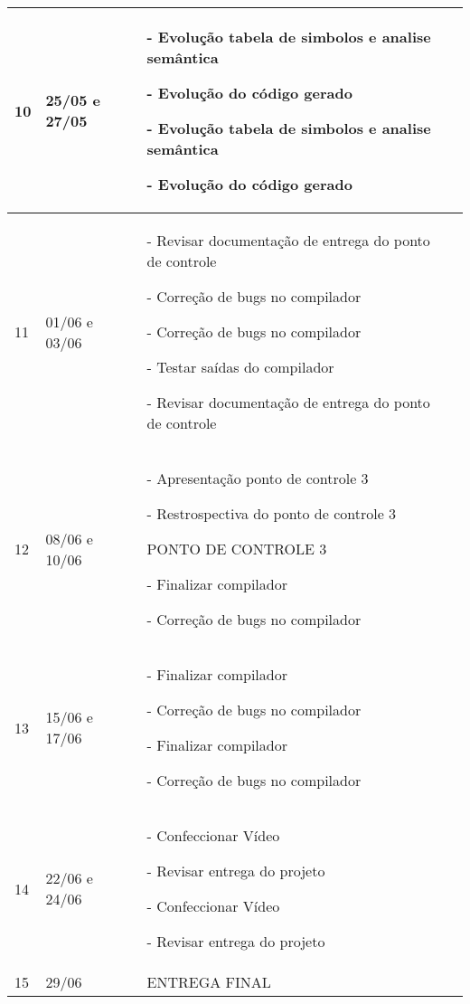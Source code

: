 \begin{table}[htb]
\center
\footnotesize
\begin{tabular}{|p{1.4cm}|p{3cm}|p{8cm}|p{8cm}|}
  \hline
   10 & 25/05 e 27/05 &
   \par - Evolução tabela de simbolos e analise semântica 
   \par - Evolução do código gerado 
   \par - Evolução tabela de simbolos e analise semântica 
   \par - Evolução do código gerado \\
   \hline
   11 & 01/06 e 03/06 &
   \par - Revisar documentação de entrega do ponto de controle 
   \par - Correção de bugs no compilador 
   \par - Correção de bugs no compilador 
   \par - Testar saídas do compilador 
   \par - Revisar documentação de entrega do ponto de controle \\
   \hline
	12 & 08/06 e 10/06 &
   \par- Apresentação ponto de controle 3 
   \par- Restrospectiva do ponto de controle 3 
   \par PONTO DE CONTROLE 3 
   \par - Finalizar compilador 
   \par- Correção de bugs no compilador \\
   \hline
	13 & 15/06 e 17/06 &
   \par - Finalizar compilador 
   \par - Correção de bugs no compilador 
   \par - Finalizar compilador 
   \par - Correção de bugs no compilador \\
   \hline
	14 & 22/06 e 24/06 &
   \par - Confeccionar Vídeo 
   \par - Revisar entrega do projeto 
   \par - Confeccionar Vídeo 
   \par - Revisar entrega do projeto \\
   \hline
	15 & 29/06 &
   \par ENTREGA FINAL \\
    \hline
\end{tabular}
\end{table}
  
